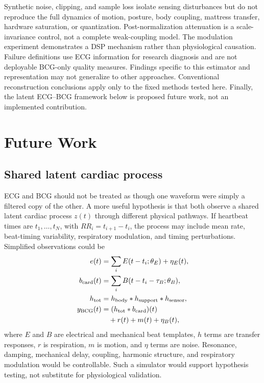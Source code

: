 \documentclass[10pt,twocolumn]{article}
\begin{document}
Synthetic noise, clipping, and sample loss isolate sensing disturbances but do not reproduce the full dynamics of motion, posture, body coupling, mattress transfer, hardware saturation, or quantization. Post-normalization attenuation is a scale-invariance control, not a complete weak-coupling model. The modulation experiment demonstrates a DSP mechanism rather than physiological causation. Failure definitions use ECG information for research diagnosis and are not deployable BCG-only quality measures. Findings specific to this estimator and representation may not generalize to other approaches. Conventional reconstruction conclusions apply only to the fixed methods tested here. Finally, the latent ECG--BCG framework below is proposed future work, not an implemented contribution.

\section{Future Work}
\subsection{Shared latent cardiac process}
ECG and BCG should not be treated as though one waveform were simply a filtered copy of the other. A more useful hypothesis is that both observe a shared latent cardiac process $z(t)$ through different physical pathways. If heartbeat times are $t_1,\ldots,t_N$, with $RR_i=t_{i+1}-t_i$, the process may include mean rate, beat-timing variability, respiratory modulation, and timing perturbations. Simplified observations could be
\begin{align}
e(t)&=\sum_i E(t-t_i;\theta_E)+\eta_E(t),\\
b_{\mathrm{card}}(t)&=\sum_i B(t-t_i-\tau_B;\theta_B),\\
h_{\mathrm{tot}}&=h_{\mathrm{body}}*h_{\mathrm{support}}*h_{\mathrm{sensor}},\\
y_{\mathrm{BCG}}(t)&=(h_{\mathrm{tot}}*b_{\mathrm{card}})(t)\notag\\
&\quad+r(t)+m(t)+\eta_B(t),
\end{align}
where $E$ and $B$ are electrical and mechanical beat templates, $h$ terms are transfer responses, $r$ is respiration, $m$ is motion, and $\eta$ terms are noise. Resonance, damping, mechanical delay, coupling, harmonic structure, and respiratory modulation would be controllable. Such a simulator would support hypothesis testing, not substitute for physiological validation.
\end{document}

